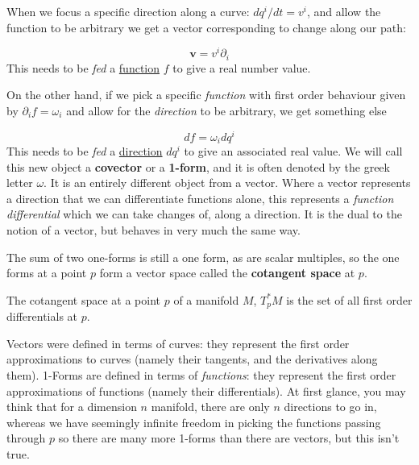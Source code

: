 \documentclass[../master.tex]{subfiles}
\begin{document}
	When we focus a specific direction along a curve: $dq^i/dt = v^i$, and allow the function to be arbitrary we get a vector corresponding to change along our path:
	
	\begin{equation}
		\mathbf v  = v^i \partial_i
	\end{equation}
	This needs to be \emph{fed} a \underline{function} $f$ to give a real number value.
	
	On the other hand, if we pick a specific \emph{function} with first order behaviour given by $\partial_i f = \omega_i$ and allow for the \emph{direction} to be arbitrary, we get something else
	
	\begin{equation}
		df = \omega_i dq^i
	\end{equation}
	This needs to be \emph{fed} a \underline{direction} $dq^i$ to give an associated real value. We will call this new object a \textbf{covector} or a \textbf{1-form}, and it is often denoted by the greek letter $\omega$. It is an entirely different object from a vector. Where a vector represents a direction that we can differentiate functions alone, this represents a \emph{function differential} which we can take changes of, along a direction. It is the dual to the notion of a vector, but behaves in very much the same way.
	
	The sum of two one-forms is still a one form, as are scalar multiples, so the one forms at a point $p$ form a vector space called the \textbf{cotangent space} at $p$.
	
	\begin{defn}
		The cotangent space at a point $p$ of a manifold $M$, $T_p^* M$ is the set of all first order differentials at $p$.
	\end{defn}
	
	Vectors were defined in terms of curves: they represent the first order approximations to curves (namely their tangents, and the derivatives along them). 1-Forms are defined in terms of \emph{functions}: they represent the first order approximations of functions (namely their differentials). At first glance, you may think that for a dimension $n$ manifold, there are only $n$ directions to go in, whereas we have seemingly infinite freedom in picking the functions passing through $p$ so there are many more 1-forms than there are vectors, but this isn't true.
	
\end{document}
